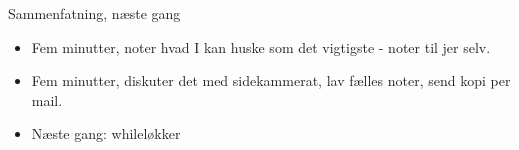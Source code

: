 \documentclass[a4paper,landscape]{slides}
\begin{document}
\begin{slide}
	\begin{center} {\large 
            Sammenfatning, næste gang
	} \end{center}
	\begin{itemize} \addtolength{\itemsep}{-\baselineskip}
		\item Fem minutter, noter hvad I kan huske som det vigtigste - noter til jer selv.
		\item Fem minutter, diskuter det med sidekammerat, lav fælles noter, send kopi per mail.
		\item Næste gang: whileløkker
	\end{itemize}
\end{slide}
\end{document}
